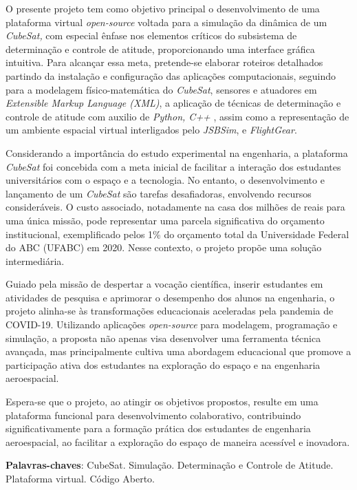 
\setlength{\absparsep}{18pt} %
\begin{resumo}

O presente projeto tem como objetivo principal o desenvolvimento de uma plataforma virtual \textit{open-source} voltada para a simulação da dinâmica de um \textit{CubeSat,} com especial ênfase nos elementos críticos do subsistema de determinação e controle de atitude, proporcionando uma interface gráfica intuitiva. Para alcançar essa meta, pretende-se elaborar roteiros detalhados partindo da instalação e configuração das aplicações computacionais, seguindo para a modelagem físico-matemática do \textit{CubeSat}, sensores e atuadores em \textit{Extensible Markup Language (XML)}, a aplicação de técnicas de determinação e controle de atitude com auxilio de \textit{Python, C++ }, assim como a representação de um ambiente espacial virtual interligados pelo \textit{JSBSim}, e \textit{FlightGear}.

Considerando a importância do estudo experimental na engenharia, a plataforma \textit{CubeSat} foi concebida com a meta inicial de facilitar a interação dos estudantes universitários com o espaço e a tecnologia. No entanto, o desenvolvimento e lançamento de um \textit{CubeSat} são tarefas desafiadoras, envolvendo recursos consideráveis. O custo associado, notadamente na casa dos milhões de reais para uma única missão, pode representar uma parcela significativa do orçamento institucional, exemplificado pelos 1\% do orçamento total da Universidade Federal do ABC (UFABC) em 2020. Nesse contexto, o projeto propõe uma solução intermediária.

Guiado pela missão de despertar a vocação científica, inserir estudantes em atividades de pesquisa e aprimorar o desempenho dos alunos na engenharia, o projeto alinha-se às transformações educacionais aceleradas pela pandemia de COVID-19. Utilizando aplicações \textit{open-source} para modelagem, programação e simulação, a proposta não apenas visa desenvolver uma ferramenta técnica avançada, mas principalmente cultiva uma abordagem educacional que promove a participação ativa dos estudantes na exploração do espaço e na engenharia aeroespacial.

Espera-se que o projeto, ao atingir os objetivos propostos, resulte em uma plataforma funcional para desenvolvimento colaborativo, contribuindo significativamente para a formação prática dos estudantes de engenharia aeroespacial, ao facilitar a exploração do espaço de maneira acessível e inovadora.


 \textbf{Palavras-chaves}: CubeSat. Simulação. Determinação e Controle de Atitude. Plataforma virtual. Código Aberto.
\end{resumo}

